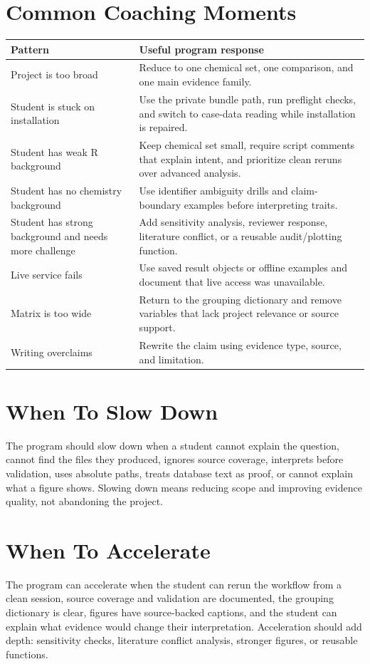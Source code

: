 \section{Common Coaching Moments}
\begin{tabularx}{\textwidth}{p{}Y}
\toprule
\textbf{Pattern} & \textbf{Useful program response}\\
\midrule
Project is too broad & Reduce to one chemical set, one comparison, and one main evidence family.\\
Student is stuck on installation & Use the private bundle path, run preflight checks, and switch to case-data reading while installation is repaired.\\
Student has weak R background & Keep chemical set small, require script comments that explain intent, and prioritize clean reruns over advanced analysis.\\
Student has no chemistry background & Use identifier ambiguity drills and claim-boundary examples before interpreting traits.\\
Student has strong background and needs more challenge & Add sensitivity analysis, reviewer response, literature conflict, or a reusable audit/plotting function.\\
Live service fails & Use saved result objects or offline examples and document that live access was unavailable.\\
Matrix is too wide & Return to the grouping dictionary and remove variables that lack project relevance or source support.\\
Writing overclaims & Rewrite the claim using evidence type, source, and limitation.\\
\bottomrule
\end{tabularx}

\section{When To Slow Down}
The program should slow down when a student cannot explain the question, cannot find the files they produced, ignores source coverage, interprets before validation, uses absolute paths, treats database text as proof, or cannot explain what a figure shows. Slowing down means reducing scope and improving evidence quality, not abandoning the project.

\section{When To Accelerate}
The program can accelerate when the student can rerun the workflow from a clean session, source coverage and validation are documented, the grouping dictionary is clear, figures have source-backed captions, and the student can explain what evidence would change their interpretation. Acceleration should add depth: sensitivity checks, literature conflict analysis, stronger figures, or reusable functions.


